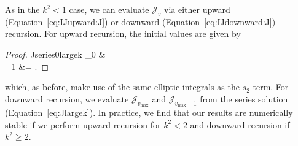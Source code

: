 \documentclass[modern]{aastex61}
\begin{document}
As in the $k^2 < 1$ case, we can evaluate $\mathcal{J}_v$ via either upward (Equation~\ref{eq:IJupward:J})
or downward (Equation~\ref{eq:IJdownward:J}) recursion. For upward recursion, the initial
values are given by
%
\begin{proof}{Jseries0largek}
    \label{Jseries0largek}
    _0 &= \left[(8-4k^{-2})E(k^{-2})-2(1-k^{-2})K(k^{-2})\right] \nonumber \\
    _1 &= \left[(-6k^2+26-16k^{-2})E(k^{-2}) + 2(1-k^{-2})(3k^2-4)K(k^{-2})\right] \quad.
\end{proof}
%
which, as before, make use of the same elliptic integrals as the $s_2$ term. For downward
recursion, we evaluate $\mathcal{J}_{v_\mathrm{max}}$ and $\mathcal{J}_{v_\mathrm{max}-1}$
from the series solution (Equation~\ref{eq:Jlargek}). In practice, we find that our results
are numerically stable if we perform upward recursion for $k^2 < 2$ and downward recursion
if $k^2 \ge 2$.




\end{document}
